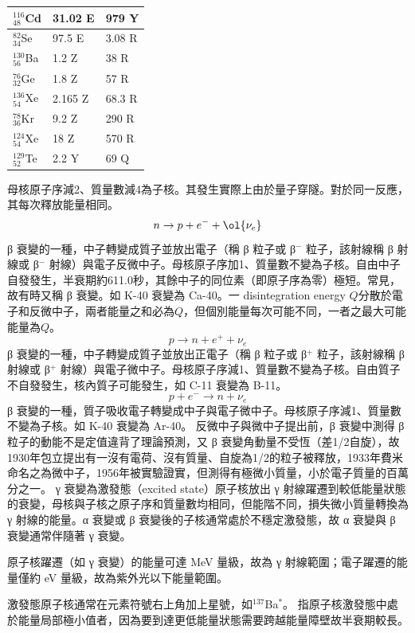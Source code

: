 \documentclass[a4paper,12pt]{article}
\begin{document}
\begin{itemize}
\begin{longtable}[c]{|p{0.25\tw}|p{0.25\tw}|p{0.25\tw}|}
$_{48}^{116}$Cd & 31.02 E & 979 Y \\\hline
$_{34}^{82}$Se & 97.5 E & 3.08 R \\\hline
$_{56}^{130}$Ba & 1.2 Z & 38 R \\\hline
$_{32}^{76}$Ge & 1.8 Z & 57 R \\\hline
$_{54}^{136}$Xe & 2.165 Z & 68.3 R \\\hline
$_{36}^{78}$Kr & 9.2 Z & 290 R \\\hline
$_{54}^{124}$Xe & 18 Z & 570 R \\\hline
$_{52}^{129}$Te & 2.2 Y & 69 Q \\\hline
\end{longtable}\FB
{}
母核原子序減2、質量數減4為子核。其發生實際上由於量子穿隧。對於同一反應，其每次釋放能量相同。
\[n \rightarrow p + e^- + \ol{\nu_e}\]
β 衰變的一種，中子轉變成質子並放出電子（稱 β 粒子或 β$^-$ 粒子，該射線稱 β 射線或 β$^-$ 射線）與電子反微中子。母核原子序加1、質量數不變為子核。自由中子自發發生，半衰期約611.0秒，其餘中子的同位素（即原子序為零）極短。常見，故有時又稱 β 衰變。如 K-40 衰變為 Ca-40。一 disintegration energy $Q$分散於電子和反微中子，兩者能量之和必為$Q$，但個別能量每次可能不同，一者之最大可能能量為$Q$。
\[p \rightarrow n + e^+ + \nu_e\]
β 衰變的一種，中子轉變成質子並放出正電子（稱 β 粒子或 β$^+$ 粒子，該射線稱 β 射線或 β$^+$ 射線）與電子微中子。母核原子序減1、質量數不變為子核。自由質子不自發發生，核內質子可能發生，如 C-11 衰變為 B-11。
\[p + e^- \rightarrow n + \nu_e\]
β 衰變的一種，質子吸收電子轉變成中子與電子微中子。母核原子序減1、質量數不變為子核。如 K-40 衰變為 Ar-40。
反微中子與微中子提出前，β 衰變中測得 β 粒子的動能不是定值違背了理論預測，又 β 衰變角動量不受恆（差1/2自旋），故1930年包立提出有一沒有電荷、沒有質量、自旋為1/2的粒子被釋放，1933年費米命名之為微中子，1956年被實驗證實，但測得有極微小質量，小於電子質量的百萬分之一。
γ 衰變為激發態（excited state）原子核放出 γ 射線躍遷到較低能量狀態的衰變，母核與子核之原子序和質量數均相同，但能階不同，損失微小質量轉換為 γ 射線的能量。α 衰變或 β 衰變後的子核通常處於不穩定激發態，故 α 衰變與 β 衰變通常伴隨著 γ 衰變。

原子核躍遷（如 γ 衰變）的能量可達 MeV 量級，故為 γ 射線範圍；電子躍遷的能量僅約 eV 量級，故為紫外光以下能量範圍。

激發態原子核通常在元素符號右上角加上星號，如$^{137}$Ba$^*$。
指原子核激發態中處於能量局部極小值者，因為要到達更低能量狀態需要跨越能量障壁故半衰期較長。


\end{itemize}
\end{document}
